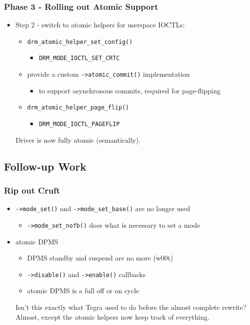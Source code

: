 \documentclass[t]{beamer}
\begin{document}
\begin{frame}
	\frametitle{Phase 3 - Rolling out Atomic Support}
	\begin{itemize}
		\item Step 2 - switch to atomic helpers for userspace IOCTLs:
			\begin{itemize}
				\item {\tt drm\_atomic\_helper\_set\_config()}
					\begin{itemize}
						\item {\tt DRM\_MODE\_IOCTL\_SET\_CRTC}
					\end{itemize}
				\item provide a custom {\tt ->atomic\_commit()} implementation
					\begin{itemize}
						\item to support asynchronous commits, required for
							page-flipping
					\end{itemize}
				\item {\tt drm\_atomic\_helper\_page\_flip()}
					\begin{itemize}
						\item {\tt DRM\_MODE\_IOCTL\_PAGEFLIP}
					\end{itemize}
			\end{itemize}

			Driver is now fully atomic (semantically).
	\end{itemize}
\end{frame}

\subsection{Follow-up Work}

\begin{frame}
	\frametitle{Rip out Cruft}
	\begin{itemize}
		\item {\tt ->mode\_set()} and {\tt ->mode\_set\_base()} are no longer
			used
			\begin{itemize}
				\item {\tt ->mode\_set\_nofb()} does what is necessary to set
					a mode
			\end{itemize}

		\item atomic DPMS
			\begin{itemize}
				\item DPMS standby and suspend are no more (w00t)
				\item {\tt ->disable()} and {\tt ->enable()} callbacks
				\item atomic DPMS is a full off or on cycle
			\end{itemize}
			Isn't this exactly what Tegra used to do before the almost
			complete rewrite? Almost, except the atomic helpers now keep
			track of everything.
	\end{itemize}
\end{frame}
\end{document}
